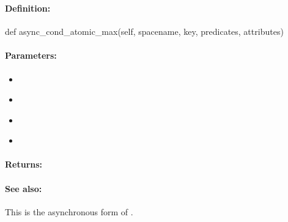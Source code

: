 \pagebreak
\subsubsection{}
\label{api:python:async_cond_atomic_max}


\paragraph{Definition:}
\begin{pythoncode}
def async_cond_atomic_max(self, spacename, key, predicates, attributes)
\end{pythoncode}

\paragraph{Parameters:}
\begin{itemize}[noitemsep]
\item {}\\

\item {}\\

\item {}\\

\item {}\\

\end{itemize}

\paragraph{Returns:}


\paragraph{See also:}  This is the asynchronous form of .

\pagebreak
\subsubsection{}
\label{api:python:group_atomic_max}


